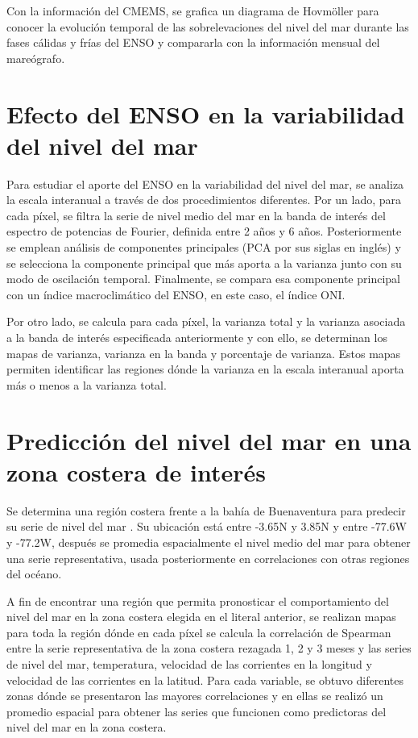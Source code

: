 Con la información del CMEMS, se grafica un diagrama de Hovmöller para conocer la evolución temporal de las sobrelevaciones del nivel del mar durante las fases cálidas y frías del ENSO y compararla con la información mensual del mareógrafo.

\section{Efecto del ENSO en la variabilidad del nivel del mar}
	
Para estudiar el aporte del ENSO en la variabilidad del nivel del mar, se analiza la escala interanual a través de dos procedimientos diferentes. Por un lado, para cada píxel, se filtra la serie de nivel medio del mar en la banda de interés del espectro de potencias de Fourier, definida entre 2 años y 6 años. Posteriormente se emplean análisis de componentes principales (PCA por sus siglas en inglés) \citep{Lund2000} y se selecciona la componente principal que más aporta a la varianza junto con su modo de oscilación temporal. Finalmente, se compara esa componente principal con un índice macroclimático del ENSO, en este caso, el índice ONI.

Por otro lado, se calcula para cada píxel, la varianza total y la varianza asociada a la banda de interés especificada anteriormente y con ello, se determinan los mapas de varianza, varianza en la banda y porcentaje de varianza. Estos mapas permiten identificar las regiones dónde la varianza en la escala interanual aporta más o menos a la varianza total.

\section{Predicción del nivel del mar en una zona costera de interés}\label{sec:1}

Se determina una región costera frente a la bahía de Buenaventura para predecir su serie de nivel del mar \citep{Montagut2012}. Su ubicación está entre -3.65\textdegree N y 3.85\textdegree N y entre -77.6\textdegree W y -77.2\textdegree W, después se promedia espacialmente el nivel medio del mar para obtener una serie representativa, usada posteriormente en correlaciones con otras regiones del océano.

A fin de encontrar una región que permita pronosticar el comportamiento del nivel del mar en la zona costera elegida en el literal anterior, se realizan mapas para toda la región dónde en cada píxel se calcula la correlación de Spearman entre la serie representativa de la zona costera rezagada 1, 2 y 3 meses y las series de nivel del mar, temperatura, velocidad de las corrientes en la longitud y velocidad de las corrientes en la latitud. Para cada variable, se obtuvo diferentes zonas dónde se presentaron las mayores correlaciones y en ellas se realizó un promedio espacial para obtener las series que funcionen como predictoras del nivel del mar en la zona costera.

